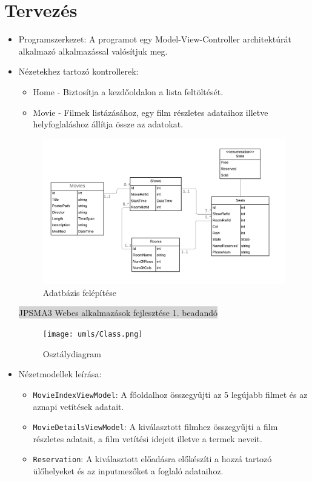 \documentclass[11pt,a4paper]{article}
\begin{document}
\section{Tervezés}
\begin{itemize}
	\item Programszerkezet: A programot egy Model-View-Controller architektúrát
	alkalmazó alkalmazással valósítjuk meg.
	\item Nézetekhez tartozó kontrollerek:
	\begin{itemize}
		\item Home - Biztosítja a kezdőoldalon a lista feltöltését.
		\item Movie - Filmek listázásához, egy film részletes adataihoz illetve
		helyfoglaláshoz állítja össze az adatokat.
	\end{itemize}
	\begin{figure}[h]
		\centering
		\includegraphics[width=18cm]{umls/Entity.png}
		\caption{Adatbázis felépítése}
	\end{figure}
	\newpage
	\thispagestyle{empty}
	\begin{center}
	\colorbox{lightgray}{{\large JPSMA3} \hspace{3cm} {\large Webes alkalmazások fejlesztése 1. beadandó} \hspace{5cm} \thepage}
	\end{center}
	\begin{figure}[h]
	\centering
	\texttt{[image: umls/Class.png]}
	\caption{Osztálydiagram}
	\end{figure}
	\item Nézetmodellek leírása:
	\begin{itemize}
		\item\verb|MovieIndexViewModel|: A főoldalhoz összegyűjti az 5 legújabb
		filmet és az aznapi vetítések adatait.
		\item\verb|MovieDetailsViewModel|: A kiválasztott filmhez összegyűjti a
		film részletes adatait, a film vetítési idejeit illetve a termek neveit.
		\item\verb|Reservation|: A kiválasztott előadásra előkészíti a hozzá
		tartozó ülőhelyeket és az inputmezőket a foglaló adataihoz.
	\end{itemize}
\end{itemize}
\end{document}
